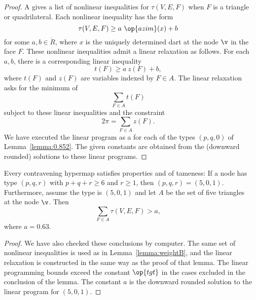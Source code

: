 \begin{proof}   A  gives a list of nonlinear
  inequalities for $\tau(V,E,F)$ when $F$ is a triangle or
  quadrilateral. Each nonlinear inequality has the form
\[ \tau(V,E,F) \ge a~\op{azim}(x) + b\] 
for some $a,b\in\ring{R}$, where $x$ is the uniquely determined dart
at the node $\v$ in the face $F$.  These nonlinear inequalities admit
a linear relaxation as follows.  For each $a,b$, there is a corresponding
linear inequality 
%
%
\[ 
t(F) \ge a~z(F) + b,
\] 
where $t(F)$ and $z(F)$ are variables indexed by $F\in A$.
%
%
%
The linear relaxation asks for the minimum of 
\[ \sum_{F\in A} t(F)\] 
subject to these linear inequalities and the constraint
\[ 
2\pi = \sum_{F\in A} z(F).
\] 
We have executed the linear program as a 
for each of the
types $(p,q,0)$ of Lemma~\ref{lemma:0.852}. The given constants are
obtained from the (downward rounded) solutions to these linear
programs.  
\end{proof}

\begin{lemma}[]\label{lemma:degE}
  Every contravening hypermap satisfies properties 
  and 
  of tameness: If a node has type $(p,q,r)$ with $p+q+r\ge 6$ and
  $r\ge 1$, then $(p,q,r)=(5,0,1)$.  Furthermore, assume the type is
  $(5,0,1)$ and let $A$ be the set of five triangles at the node $\v$.
  Then %
\[ 
\sum_{F\in A} \tau(V,E,F) > a,
\] 
where $a=0.63$.
\end{lemma}



\begin{proof} We have also checked these conclusions by computer.  The
  same set of nonlinear inequalities is used as in
  Lemma~\ref{lemma:weightB}, and the linear relaxation is constructed
  in the same way as the proof of that lemma.  The linear programming
  bounds exceed the constant $\op{tgt}$ in the cases excluded in the
  conclusion of the lemma.  The constant $a$ is the downward rounded
   solution to the linear program for $(5,0,1)$.
\end{proof}
%

